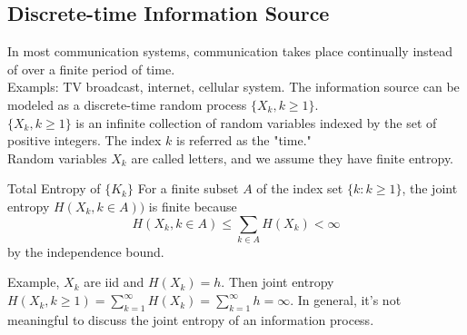 \documentclass[../main.tex]{subfiles}
\begin{document}
\subsection{Discrete-time Information Source}
In most communication systems, communication takes place continually instead of over a finite period of time.\\
Exampls: TV broadcast, internet, cellular system.
The information source can be modeled as a discrete-time random process $\{X_k,k\geq 1\}$.\\
$\{X_k,k\geq 1\}$ is an infinite collection of random variables indexed by the set of positive integers. The index $k$ is referred as the "time."\\
Random variables $X_k$ are called letters, and we assume they have finite entropy.
\begin{gbox}{Total Entropy of $\{K_k\}$}
    For a finite subset $A$ of the index set $\{k:k\geq 1\}$, the joint entropy $H(X_k, k\in A))$ is finite because \begin{equation*}
        H(X_k, k\in A) \leq \sum_{k\in A} H(X_k) < \infty
    \end{equation*} by the independence bound.
\end{gbox}
Example, $X_k$ are iid and $H(X_k)=h$. Then joint entropy $H(X_k,k\geq 1)=\sum_{k=1}^{\infty}H(X_k)=\sum_{k=1}^{\infty} h = \infty$. In general, it's not meaningful to discuss the joint entropy of an information process.
\end{document}
